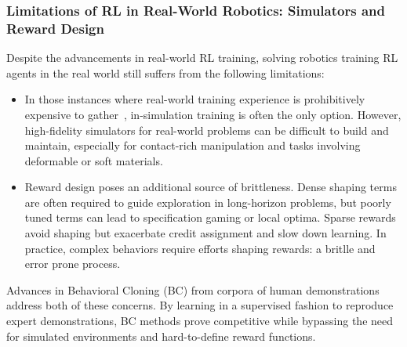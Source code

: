 \subsubsection{Limitations of RL in Real-World Robotics: Simulators and Reward Design}

Despite the advancements in real-world RL training, solving robotics training RL agents in the real world still suffers from the following limitations:
\begin{itemize}
\item In those instances where real-world training experience is prohibitively expensive to gather~\citep{degraveMagneticControlTokamak2022, bellemareAutonomousNavigationStratospheric2020}, in-simulation training is often the only option. However, high-fidelity simulators for real-world problems can be difficult to build and maintain, especially for contact-rich manipulation and tasks involving deformable or soft materials.

\item Reward design poses an additional source of brittleness. Dense shaping terms are often required to guide exploration in long-horizon problems, but poorly tuned terms can lead to specification gaming or local optima. Sparse rewards avoid shaping but exacerbate credit assignment and slow down learning. In practice, complex behaviors require efforts shaping rewards: a britlle and error prone process.
\end{itemize}

Advances in Behavioral Cloning (BC) from corpora of human demonstrations address both of these concerns.
By learning in a supervised fashion to reproduce expert demonstrations, BC methods prove competitive while bypassing the need for simulated environments and hard-to-define reward functions.

